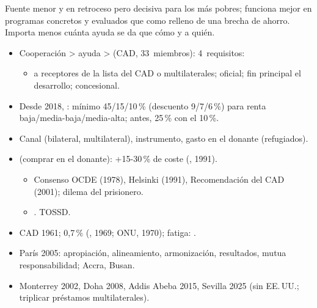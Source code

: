 \documentclass{article}
\begin{document}
\begin{columnas}
\begin{ideaclave}
Fuente menor y en retroceso pero decisiva para los más pobres; funciona mejor en programas concretos y evaluados que como relleno de una brecha de ahorro. Importa menos cuánta ayuda se da que cómo y a quién.
\end{ideaclave}
\begin{itemize}
\item Cooperación > ayuda >  (CAD, 33~miembros): 4~requisitos:
  \begin{itemize}
  \item a receptores de la lista del CAD o multilaterales; oficial; fin principal el desarrollo; concesional.
  \end{itemize}
\item Desde 2018, :  mínimo 45/15/10\,\% (descuento 9/7/6\,\%) para renta baja/media-baja/media-alta; antes, 25\,\% con el 10\,\%.
\item Canal (bilateral, multilateral), instrumento, gasto en el donante (refugiados).
\item {} (comprar en el donante): +15-30\,\% de coste (, 1991).
  \begin{itemize}
  \item Consenso OCDE (1978), Helsinki (1991), Recomendación del CAD (2001); dilema del prisionero.
  \item {}. TOSSD.
  \end{itemize}
\end{itemize}
\begin{itemize}
\item CAD 1961; 0,7\,\% (, 1969; ONU, 1970); fatiga: .
\item París 2005: apropiación, alineamiento, armonización, resultados, mutua responsabilidad; Accra, Busan.
\end{itemize}
\begin{itemize}
\item Monterrey 2002, Doha 2008, Addis Abeba 2015, Sevilla 2025 (sin EE.\,UU.; triplicar préstamos multilaterales).
\end{itemize}

\end{columnas}
\end{document}
